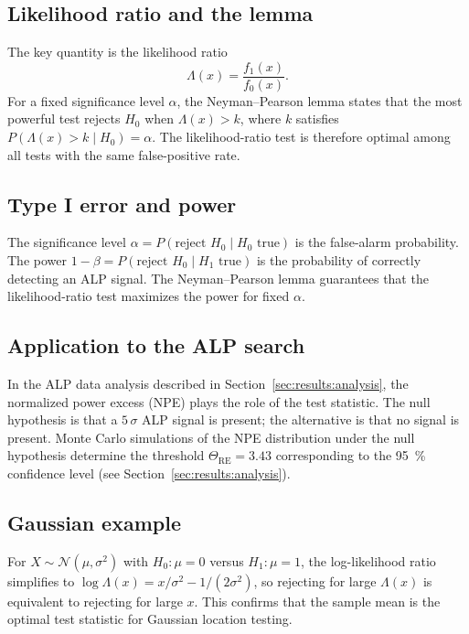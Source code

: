 \subsection{Likelihood ratio and the lemma}

The key quantity is the likelihood ratio
\[
\Lambda(x) = \frac{f_1(x)}{f_0(x)}.
\]
For a fixed significance level $\alpha$, the Neyman--Pearson lemma states that the most powerful test rejects $H_0$ when $\Lambda(x) > k$, where $k$ satisfies $P(\Lambda(x)>k\mid H_0)=\alpha$. The likelihood-ratio test is therefore optimal among all tests with the same false-positive rate.

\subsection{Type I error and power}

The significance level $\alpha = P(\text{reject }H_0\mid H_0\text{ true})$ is the false-alarm probability. The power $1-\beta = P(\text{reject }H_0\mid H_1\text{ true})$ is the probability of correctly detecting an ALP signal. The Neyman--Pearson lemma guarantees that the likelihood-ratio test maximizes the power for fixed $\alpha$.

\subsection{Application to the ALP search}

In the ALP data analysis described in Section~\ref{sec:results:analysis}, the normalized power excess (NPE) plays the role of the test statistic. The null hypothesis is that a $5\,\sigma$ ALP signal is present; the alternative is that no signal is present. Monte Carlo simulations of the NPE distribution under the null hypothesis determine the threshold $\Theta_\mathrm{RE} = 3.43$ corresponding to the \SI{95}{\%} confidence level (see Section~\ref{sec:results:analysis}).

\subsection{Gaussian example}

For $X\sim\mathcal{N}(\mu,\sigma^2)$ with $H_0:\mu=0$ versus $H_1:\mu=1$, the log-likelihood ratio simplifies to $\log\Lambda(x) = x/\sigma^2 - 1/(2\sigma^2)$, so rejecting for large $\Lambda(x)$ is equivalent to rejecting for large $x$. This confirms that the sample mean is the optimal test statistic for Gaussian location testing.


